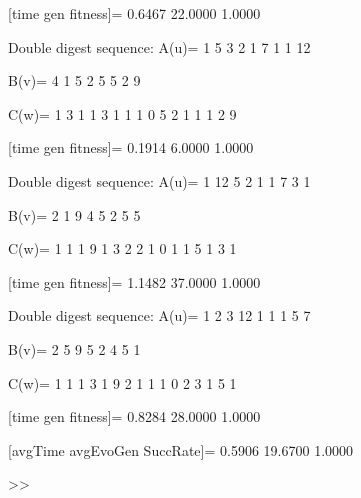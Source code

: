 [time gen fitness]=
    0.6467   22.0000    1.0000

Double digest sequence:
A(u)=
     1     5     3     2     1     7     1     1    12

B(v)=
     4     1     5     2     5     5     2     9

C(w)=
     1     3     1     1     3     1     1     1     0     5     2     1     1     1     2     9

[time gen fitness]=
    0.1914    6.0000    1.0000

Double digest sequence:
A(u)=
     1    12     5     2     1     1     7     3     1

B(v)=
     2     1     9     4     5     2     5     5

C(w)=
     1     1     1     9     1     3     2     2     1     0     1     1     5     1     3     1

[time gen fitness]=
    1.1482   37.0000    1.0000

Double digest sequence:
A(u)=
     1     2     3    12     1     1     1     5     7

B(v)=
     2     5     9     5     2     4     5     1

C(w)=
     1     1     1     3     1     9     2     1     1     1     0     2     3     1     5     1

[time gen fitness]=
    0.8284   28.0000    1.0000

[avgTime  avgEvoGen  SuccRate]=
    0.5906   19.6700    1.0000

>> 